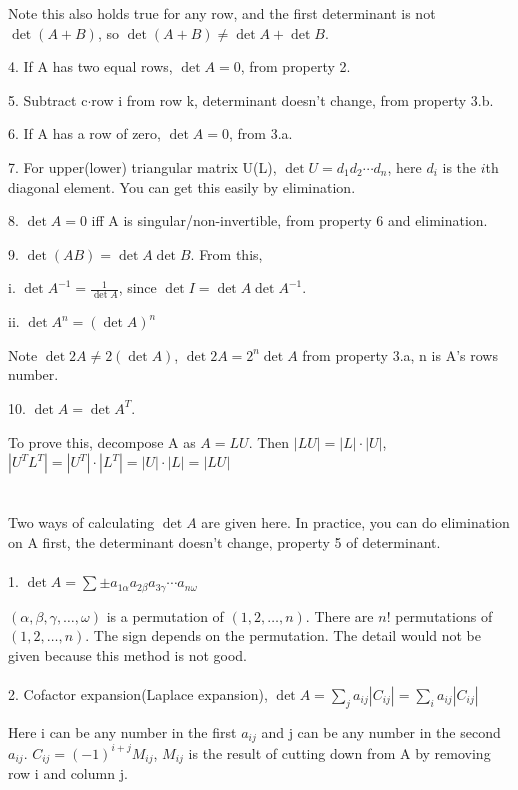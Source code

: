 \documentclass{article}
\begin{document}
\begin{spacing}{1.5}
Note this also holds true for any row, and the first determinant is not $\det(A+B)$, so $\det(A+B)\neq \det A + \det B$.

4. If A has two equal rows, $\det A = 0$, from property 2. 

5. Subtract c$\cdot$row i from row k, determinant doesn't change, from property 3.b.

6. If A has a row of zero, $\det A=0$, from 3.a. 

7. For upper(lower) triangular matrix U(L), $\det U = d_1d_2\cdots d_n$, here $d_i$ is the $i$th diagonal element. You can get this easily by elimination.

8. $\det A=0$ iff A is singular/non-invertible, from property 6 and elimination.

9. $\det(AB)=\det A\det B$. From this,

i. $\det A^{-1}=\frac{1}{\det A}$, since $\det I=\det A\det A^{-1}$.

ii. $\det A^n=(\det A)^n$

Note $\det 2A \neq 2(\det A)$, $\det 2A=2^n\det A$ from property 3.a, n is A's rows number.

10. $\det A = \det A^T$.

To prove this, decompose A as $A=LU$. Then $|LU|=|L|\cdot|U|$, $|U^TL^T|=|U^T|\cdot|L^T|=|U|\cdot|L|=|LU|$


\section{}
\hspace*{0.5cm}Two ways of calculating $\det A$ are given here. In practice, you can do elimination on A first, the determinant doesn't change, property 5 of determinant.
\\\\1. $\det A=\sum \pm a_{1\alpha}a_{2\beta}a_{3\gamma}\cdots a_{n\omega}$

$(\alpha, \beta, \gamma, \dots, \omega)$ is a permutation of $(1, 2, \dots, n)$. There are
$n!$ permutations of  $(1, 2, \dots, n)$. The sign depends on the permutation. The detail would not be given because this method is not good.
\\\\2. Cofactor expansion(Laplace expansion), $\det A=\sum_j a_{ij}|C_{ij}| = \sum_i a_{ij}|C_{ij}|$

Here i can be any number in the first $a_{ij}$ and j can be any number in the second $a_{ij}$. $C_{ij}=(-1)^{i+j}M_{ij}$, $M_{ij}$ is the result of cutting down from A by removing row i and column j.


\end{spacing}
\end{document}
